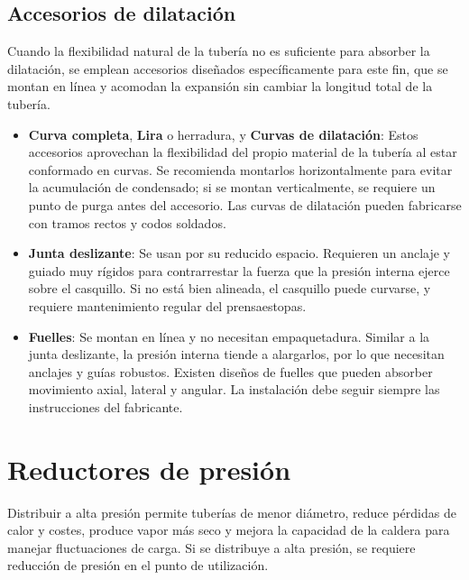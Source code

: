 \subsection{Accesorios de dilatación}
Cuando la flexibilidad natural de la tubería no es suficiente para absorber la dilatación, se emplean accesorios diseñados específicamente para este fin, que se montan en línea y acomodan la expansión sin cambiar la longitud total de la tubería.
\begin{itemize}
    \item \textbf{Curva completa}, \textbf{Lira} o herradura, y \textbf{Curvas de dilatación}: Estos accesorios aprovechan la flexibilidad del propio material de la tubería al estar conformado en curvas. Se recomienda montarlos horizontalmente para evitar la acumulación de condensado; si se montan verticalmente, se requiere un punto de purga antes del accesorio. Las curvas de dilatación pueden fabricarse con tramos rectos y codos soldados.
    \item \textbf{Junta deslizante}: Se usan por su reducido espacio. Requieren un anclaje y guiado muy rígidos para contrarrestar la fuerza que la presión interna ejerce sobre el casquillo. Si no está bien alineada, el casquillo puede curvarse, y requiere mantenimiento regular del prensaestopas.
    \item \textbf{Fuelles}: Se montan en línea y no necesitan empaquetadura. Similar a la junta deslizante, la presión interna tiende a alargarlos, por lo que necesitan anclajes y guías robustos. Existen diseños de fuelles que pueden absorber movimiento axial, lateral y angular. La instalación debe seguir siempre las instrucciones del fabricante.
\end{itemize}

\section{Reductores de presión}
Distribuir a alta presión permite tuberías de menor diámetro, reduce pérdidas de calor y costes, produce vapor más seco y mejora la capacidad de la caldera para manejar fluctuaciones de carga. Si se distribuye a alta presión, se requiere reducción de presión en el punto de utilización.


